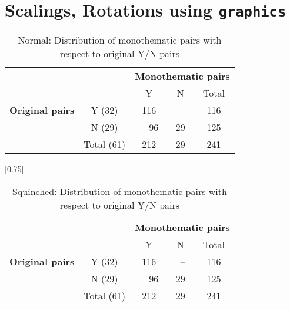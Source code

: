 \documentclass{article}
\begin{document}
\listoftables
\listoffigures
\section{Scalings, Rotations using \texttt{graphics}}

\begin{table}[htb]
\centering
  \begin{tabular}{|c|c|c|c|c|} \hline
   \multicolumn{1}{|c|}{\multirow{5}{5pt}{\begin{rotatebox}{90}{{\footnotesize \textbf{Original pairs}}}\end{rotatebox}}} &
     \multicolumn{1}{|c|}{ } & \multicolumn{3}{|c|}{\textbf{Monothematic pairs}}\\ \cline{2-5}
     & & Y & N & Total \\ \cline{2-5}
     & Y (32) & 116 & \ -- &  116  \\ \cline{2-5}
     & N (29) & \ \ 96 & 29 & 125  \\ \cline{2-5}
     & Total (61) & 212 & 29 & 241  \\ \hline
  \end{tabular}
  \caption{Normal: Distribution of monothematic pairs with respect to original Y/N pairs}
  \label{tb:tab1}
\end{table}

\begin{table}[htb]
\scalebox{1.5}[0.75]{
\centering
  \begin{tabular}{|c|c|c|c|c|} \hline
   \multicolumn{1}{|c|}{\multirow{5}{5pt}{\begin{rotatebox}{90}{{\footnotesize \textbf{Original pairs}}}\end{rotatebox}}} &
     \multicolumn{1}{|c|}{ } & \multicolumn{3}{|c|}{\textbf{Monothematic pairs}}\\ \cline{2-5}
     & & Y & N & Total \\ \cline{2-5}
     & Y (32) & 116 & \ -- &  116  \\ \cline{2-5}
     & N (29) & \ \ 96 & 29 & 125  \\ \cline{2-5}
     & Total (61) & 212 & 29 & 241  \\ \hline
  \end{tabular}
  }
   \caption{Squinched: Distribution of monothematic pairs with respect to original Y/N pairs}
  \label{tb:tab2}
\end{table}
\end{document}
